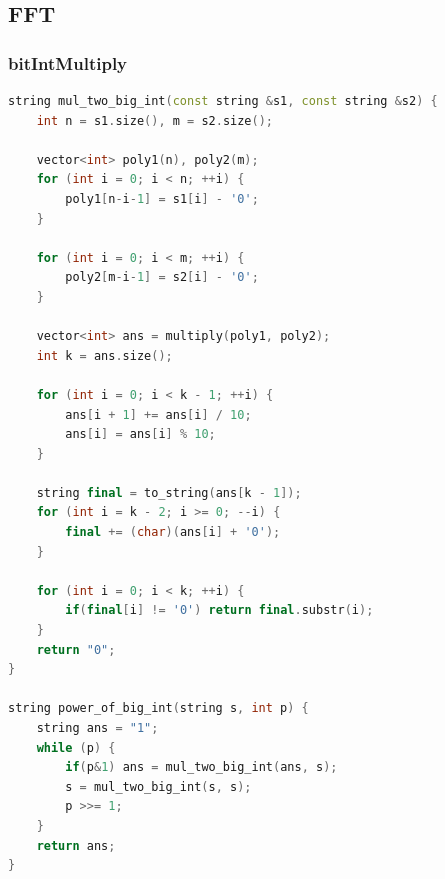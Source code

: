 \documentclass[10pt,landscape,a4paper,twocolumn]{article}
\begin{document}
\subsection{FFT}
\subsubsection{bitIntMultiply}
\begin{lstlisting}[language=C++]
string mul_two_big_int(const string &s1, const string &s2) {
    int n = s1.size(), m = s2.size();

    vector<int> poly1(n), poly2(m);
    for (int i = 0; i < n; ++i) {
        poly1[n-i-1] = s1[i] - '0';
    }

    for (int i = 0; i < m; ++i) {
        poly2[m-i-1] = s2[i] - '0';
    }

    vector<int> ans = multiply(poly1, poly2);
    int k = ans.size();

    for (int i = 0; i < k - 1; ++i) {
        ans[i + 1] += ans[i] / 10;
        ans[i] = ans[i] % 10;
    }

    string final = to_string(ans[k - 1]);
    for (int i = k - 2; i >= 0; --i) {
        final += (char)(ans[i] + '0');
    }

    for (int i = 0; i < k; ++i) {
        if(final[i] != '0') return final.substr(i);
    }
    return "0";
}

string power_of_big_int(string s, int p) {
    string ans = "1";
    while (p) {
        if(p&1) ans = mul_two_big_int(ans, s);
        s = mul_two_big_int(s, s);
        p >>= 1;
    }
    return ans;
}
\end{lstlisting}
\end{document}
